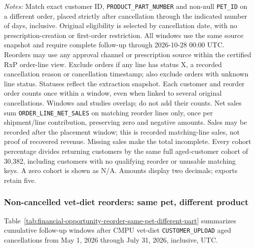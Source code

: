 \begin{table}[!htbp]
\begin{minipage}{\linewidth}
\footnotesize
\textit{Notes:} Match exact customer ID, \texttt{PRODUCT\_PART\_NUMBER} and non-null
\texttt{PET\_ID} on a different order, placed strictly after cancellation through
the indicated number of days, inclusive. Original eligibility is selected by
cancellation date, with no prescription-creation or first-order restriction.
All windows use the same source snapshot and require complete follow-up through
2026-10-28 00:00 UTC. Reorders may use any approval channel or prescription
source within the certified RxP order-line view. Exclude orders if any line has
status X, a recorded cancellation reason or cancellation timestamp; also exclude
orders with unknown line status. Statuses reflect the extraction snapshot.
Each customer and reorder order counts once within a window, even when linked
to several original cancellations. Windows and studies overlap; do not add their counts.
Net sales sum \texttt{ORDER\_LINE\_NET\_SALES} on matching reorder lines only,
once per shipment/line contribution, preserving zero and negative amounts.
Sales may be recorded after the placement window; this is recorded matching-line
sales, not proof of recovered revenue. Missing sales make the total incomplete.
Every cohort percentage divides returning customers by the same full aged-customer cohort of 30,382, including customers with no qualifying reorder or unusable matching keys. A zero cohort is shown as N/A. Amounts display two decimals; exports retain five.
\end{minipage}
\end{table}

\clearpage
\subsubsection{Non-cancelled vet-diet reorders: same pet, different product}
Table~\ref{tab:financial-opportunity-reorder-same-pet-different-part} summarizes cumulative
follow-up windows after CMPU vet-diet \texttt{CUSTOMER\_UPLOAD} aged cancellations
from May 1, 2026 through July 31, 2026, inclusive, UTC.

